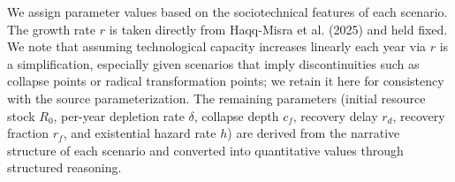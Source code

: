 





We assign parameter values based on the sociotechnical features of each scenario. The growth rate \(r\) is taken directly from Haqq-Misra et al. (2025) and held fixed. We note that assuming technological capacity increases linearly each year via \(r\) is a simplification, especially given scenarios that imply discontinuities such as collapse points or radical transformation points; we retain it here for consistency with the source parameterization. The remaining parameters (initial resource stock \(R_{0}\), per-year depletion rate \(\delta\), collapse depth \(c_{f}\), recovery delay \(r_{d}\), recovery fraction \(r_{f}\), and existential hazard rate \(h\)) are derived from the narrative structure of each scenario and converted into quantitative values through structured reasoning. 

